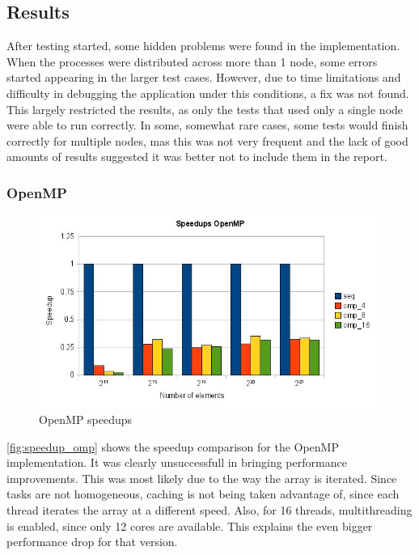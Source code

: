 \subsection{Results}

After testing started, some hidden problems were found in the implementation. When the processes were distributed across more than 1 node, some errors started appearing in the larger test cases. However, due to time limitations and difficulty in debugging the application under this conditions, a fix was not found. This largely restricted the results, as only the tests that used only a single node were able to run correctly. In some, somewhat rare cases, some tests would finish correctly for multiple nodes, mas this was not very frequent and the lack of good amounts of results suggested it was better not to include them in the report.

\subsubsection{OpenMP}

\begin{figure}[!htpb]
	\begin{center}
	\includegraphics[width=\columnwidth]{images/speedup_omp}
	\end{center}
	\caption{OpenMP speedups}
	\label{fig:speedup_omp}
\end{figure}

\autoref{fig:speedup_omp} shows the speedup comparison for the OpenMP implementation. It was clearly unsuccessfull in bringing performance improvements. This was most likely due to the way the array is iterated. Since tasks are not homogeneous, caching is not being taken advantage of, since each thread iterates the array at a different speed. Also, for 16 threads, multithreading is enabled, since only 12 cores are available. This explains the even bigger performance drop for that version.

